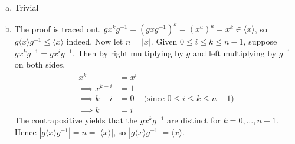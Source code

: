 \documentclass{article}
\newcommand{\inv}[1]{ {#1}^{-1} }
\newcommand{\norm}[1]{|#1|}
\newcommand{\cyclic}[1]{\langle#1\rangle}
\begin{document}
\subsubsection{}\label{ex3p21}
\subsubsection{}\label{ex3p22}
\subsubsection{}\label{ex3p23}
\subsubsection{}\label{ex3p24}
\begin{enumerate}[(a)]
\item Trivial
\item The proof is traced out. $gx^k\inv{g}=(gx\inv{g})^k = (x^a)^k = x^k \in \cyclic{x}$, so $g\cyclic{x}\inv{g} \leq \cyclic{x}$ indeed. Now let $n=\norm{x}$. Given $0 \leq i \leq k \leq n-1$, suppose $gx^k\inv{g} = gx^i\inv{g}$. Then by right multiplying by $g$ and left multiplying by $\inv{g}$ on both sides,
\begin{align*}
x^k &= x^i\\
\implies x^{k-i} &= 1\\
\implies k-i &= 0 & \mbox{(since $0\leq i\leq k\leq n-1$)}\\
\implies k &= i
\end{align*}
The contrapositive yields that the $gx^k\inv{g}$ are distinct for $k=0,\ldots,n-1$. Hence $\norm{g\cyclic{x}\inv{g}} = n = \norm{\cyclic{x}}$, so $\norm{g\cyclic{x}\inv{g}} = \cyclic{x}$.
\end{enumerate}
\end{document}

